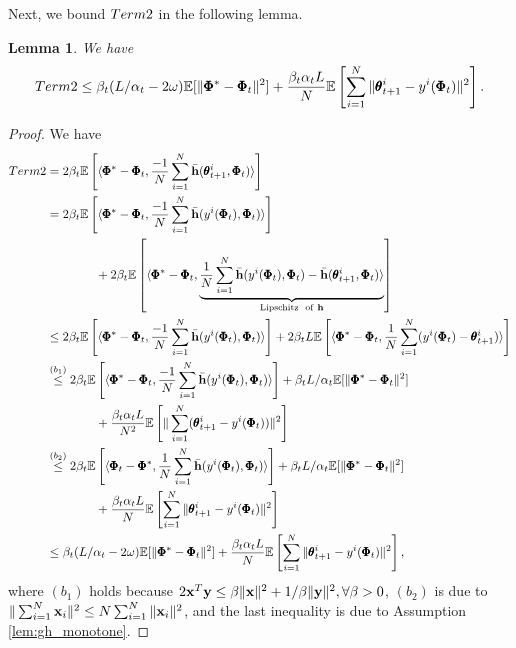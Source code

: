 \documentclass{article} %
\theoremstyle{plain}
\newtheorem{lemma}[theorem]{Lemma}
\theoremstyle{definition}
\theoremstyle{remark}
\begin{document}
{{Next, we bound $\textnormal{Term 2}$ in the following lemma.}
\begin{lemma}\label{lemma:Term2}
We have 
\begin{align}
    \textnormal{Term 2}\leq 
 \beta_t(L/\alpha_t-2\omega)\mathbb{E}[\|\pmb{\Phi}^*-\pmb{\Phi}_t\|^2]+\frac{\beta_t\alpha_tL}{N}\mathbb{E}\left[\sum_{i=1}^N \|\pmb{\theta}_{t+1}^i-y^i(\pmb{\Phi}_t)\|^2\right].
\end{align}
\end{lemma}
\begin{proof}
We have
\begin{align*}
 \textnormal{Term 2} &=2\beta_t\mathbb{E}\left[\langle\pmb{\Phi}^*-\pmb{\Phi}_t, \frac{-1}{N}\sum_{i=1}^N\bar{\bh}(\pmb{\theta}_{t+1}^i,\pmb{\Phi}_t)\rangle\right]\allowdisplaybreaks\\
&=2\beta_t\mathbb{E}\left[\langle\pmb{\Phi}^*-\pmb{\Phi}_t, \frac{-1}{N}\sum_{i=1}^N\bar{\bh}(y^i(\pmb{\Phi}_t),\pmb{\Phi}_t)\rangle\right]\allowdisplaybreaks\\
&\qquad\qquad+2\beta_t\mathbb{E}\left[\langle\pmb{\Phi}^*-\pmb{\Phi}_t, \underset{\text{Lipschitz ~of}~\bh}{\underbrace{\frac{1}{N}\sum_{i=1}^N\bar{\bh}(y^i(\pmb{\Phi}_t),\pmb{\Phi}_t)-\bar{\bh}(\pmb{\theta}_{t+1}^i,\pmb{\Phi}_t)\rangle}}\right]\allowdisplaybreaks\\
    &\leq 2\beta_t\mathbb{E}\left[\langle\pmb{\Phi}^*-\pmb{\Phi}_t, \frac{-1}{N}\sum_{i=1}^N\bar{\bh}(y^i(\pmb{\Phi}_t),\pmb{\Phi}_t)\rangle\right]+2\beta_t L\mathbb{E}\left[\langle\pmb{\Phi}^*-\pmb{\Phi}_t, \frac{1}{N}\sum_{i=1}^N(y^i(\pmb{\Phi}_t)-\pmb{\theta}_{t+1}^i)\rangle\right]\allowdisplaybreaks\\
    &\overset{(b_1)}{\leq} 2\beta_t\mathbb{E}\left[\langle\pmb{\Phi}^*-\pmb{\Phi}_t, \frac{-1}{N}\sum_{i=1}^N\bar{\bh}(y^i(\pmb{\Phi}_t),\pmb{\Phi}_t)\rangle\right]+\beta_t L/\alpha_t\mathbb{E}[\|\pmb{\Phi}^*-\pmb{\Phi}_t\|^2]\allowdisplaybreaks\\
    &\qquad\qquad+\frac{\beta_t\alpha_t L}{N^2}\mathbb{E}\left[ \|\sum_{i=1}^N(\pmb{\theta}_{t+1}^i-y^i(\pmb{\Phi}_t))\|^2\right]\allowdisplaybreaks\\
       &\overset{(b_2)}{\leq} 2\beta_t\mathbb{E}\left[\langle\pmb{\Phi}_t-\pmb{\Phi}^*, \frac{1}{N}\sum_{i=1}^N\bar{\bh}(y^i(\pmb{\Phi}_t),\pmb{\Phi}_t)\rangle\right]+\beta_t L/\alpha_t\mathbb{E}[\|\pmb{\Phi}^*-\pmb{\Phi}_t\|^2]\allowdisplaybreaks\\
       &\qquad\qquad+\frac{\beta_t\alpha_t L}{N}\mathbb{E}\left[\sum_{i=1}^N \|\pmb{\theta}_{t+1}^i-y^i(\pmb{\Phi}_t)\|^2\right]\\
       &\leq \beta_t(L/\alpha_t-2\omega)\mathbb{E}[\|\pmb{\Phi}^*-\pmb{\Phi}_t\|^2]+\frac{\beta_t\alpha_t L}{N}\mathbb{E}\left[\sum_{i=1}^N \|\pmb{\theta}_{t+1}^i-y^i(\pmb{\Phi}_t)\|^2\right],
\end{align*}
where $(b_1)$ holds because $2\bold{x}^T\bold{y}\leq \beta\|\bold{x}\|^2+1/\beta\|\bold{y}\|^2, \forall \beta>0$, $(b_2)$ is due to $\|\sum_{i=1}^N {\mathbf{x}}_i\|^2\leq N\sum_{i=1}^N\|{\mathbf{x}}_i\|^2$,
and the last inequality is due to Assumption \ref{lem:gh_monotone}.
 

\end{proof}}
\end{document}
